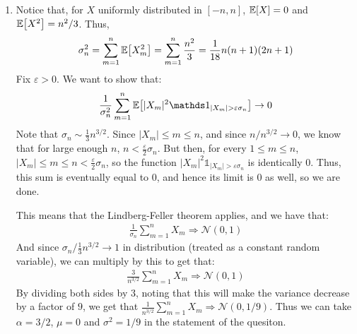 \documentclass[12pt]{article}
\theoremstyle{definitionstyle}
\def\ve{\varepsilon}
\newcommand{\1}{\mathds 1}
\newcommand{\E}{\mathbb E \qty}
\begin{document}
\begin{enumerate}
        \item Notice that, for $X$ uniformly distributed in $[-n, n]$, $\E[X] = 0$ and $\E[X^2] = n^2/3$. Thus,
        \begin{align*}
            \sigma_n^2 = \sum_{m=1}^n \E[X_m^2] = \sum_{m=1}^n \frac{n^2}{3} = \frac{1}{18} n(n+1)(2n+1)
        \end{align*}
        Fix $\ve > 0$. We want to show that:
        \begin{align*}
            \frac{1}{\sigma_n^2} \sum_{m=1}^n \E[|X_m|^2 \1_{|X_m| > \ve \sigma_n}] \to 0
        \end{align*}
        Note that $\sigma_n \sim \frac 13 n^{3/2}$. Since $|X_m| \leq m \leq n$, and since $n/n^{3/2} \to 0$, we know that for large enough $n$, $n < \frac{\ve}{2} \sigma_n$. But then, for every $1 \leq m \leq n$, $|X_m| \leq m \leq n < \frac{\ve}{2} \sigma_n$, so the function $|X_m|^2 \1_{|X_m| > \ve \sigma_n}$ is identically 0. Thus, this sum is eventually equal to 0, and hence its limit is 0 as well, so we are done.

        This means that the Lindberg-Feller theorem applies, and we have that:
        \begin{align*}
            \frac{1}{\sigma_n} \sum_{m=1}^n X_m \Rightarrow \mathcal N(0,1)
        \end{align*}
        And since $\sigma_n \big / \frac 13 n^{3/2} \to 1$ in distribution (treated as a constant random variable), we can multiply by this to get that:
        \begin{align*}
            \frac{3}{n^{3/2}} \sum_{m=1}^n X_m \Rightarrow \mathcal N(0,1)
        \end{align*}
        By dividing both sides by $3$, noting that this will make the variance decrease by a factor of $9$, we get that $\frac{1}{n^{3/2}} \sum_{m=1}^n X_m \Rightarrow \mathcal N(0,1/9)$.
        Thus we can take $\alpha = 3/2$, $\mu = 0$ and $\sigma^2 = 1/9$ in the statement of the quesiton.


\end{enumerate}
\end{document}
